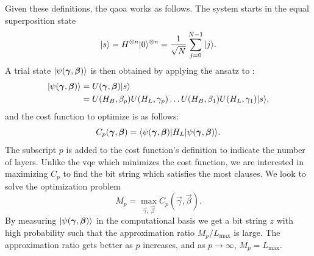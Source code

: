 Given these definitions, the \gls{qaoa} works as follows.
The system starts in the equal superposition state
\begin{equation}
\vert{s}\rangle = H^{\otimes n}\vert{0}\rangle^{\otimes n} = \frac{1}{\sqrt{N}} \sum_{j=0}^{N-1} \vert{j}\rangle.
\end{equation}
A trial state $\vert{\psi(\bm{\gamma}, \bm{\beta})}\rangle$ is then obtained by applying the ansatz to :
\begin{align}
\vert{\psi(\bm{\gamma}, \bm{\beta})}\rangle &= U(\bm{\gamma}, \bm{\beta})\vert{s}\rangle \\
&= U(H_B, \beta_p)U(H_L, \gamma_p) \ldots U(H_B, \beta_1)U(H_L, \gamma_1)\vert{s}\rangle,
\end{align}
and the cost function to optimize is as follows:
\begin{equation} 
C_p(\bm{\gamma}, \bm{\beta}) = \langle{\psi(\bm{\gamma}, \bm{\beta})}\vert H_L\vert{\psi(\bm{\gamma}, \bm{\beta})}\rangle.
\end{equation}
The subscript $p$ is added to the cost function's definition to indicate the number of layers.
Unlike the \gls{vqe} which minimizes the cost function, we are interested in maximizing $C_p$ to find the bit string which satisfies the most clauses.
We look to solve the optimization problem
\begin{equation}
M_p = \max_{\vec{\gamma}, \, \vec{\beta}} C_p(\vec{\gamma}, \vec{\beta}).
\end{equation}
By measuring $\vert{\psi(\bm{\gamma}, \bm{\beta})}\rangle$ in the computational basis we get a bit string $z$ with high probability such that the approximation ratio $M_p/L_{\text{max}}$ is large. 
The approximation ratio gets better as $p$ increases, and as $p \to \infty$, $M_p = L_{\text{max}}$.
